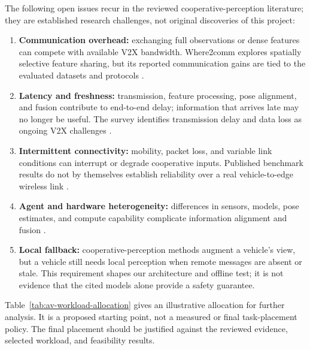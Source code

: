 \documentclass[12pt,a4paper,oneside]{report}
\begin{document}
The following open issues recur in the reviewed cooperative-perception
literature; they are established research challenges, not original
discoveries of this project:
\begin{enumerate}
  \item \textbf{Communication overhead:} exchanging full observations or
  dense features can compete with available V2X bandwidth. Where2comm
  explores spatially selective feature sharing, but its reported
  communication gains are tied to the evaluated datasets and protocols
  \cite{where2comm2022,opv2v2022}.
  \item \textbf{Latency and freshness:} transmission, feature processing,
  pose alignment, and fusion contribute to end-to-end delay; information
  that arrives late may no longer be useful. The survey identifies
  transmission delay and data loss as ongoing V2X challenges
  \cite{v2xsurvey2025}.
  \item \textbf{Intermittent connectivity:} mobility, packet loss, and
  variable link conditions can interrupt or degrade cooperative inputs.
  Published benchmark results do not by themselves establish reliability
  over a real vehicle-to-edge wireless link \cite{v2xsurvey2025,opv2v2022}.
  \item \textbf{Agent and hardware heterogeneity:} differences in sensors,
  models, pose estimates, and compute capability complicate information
  alignment and fusion \cite{v2xvit2022,v2xsurvey2025}.
  \item \textbf{Local fallback:} cooperative-perception methods augment a
  vehicle's view, but a vehicle still needs local perception when remote
  messages are absent or stale. This requirement shapes our architecture
  and offline test; it is not evidence that the cited models alone provide
  a safety guarantee.
\end{enumerate}

Table~\ref{tab:av-workload-allocation} gives an illustrative allocation
for further analysis. It is a proposed starting point, not a measured or
final task-placement policy. The final placement should be justified
against the reviewed evidence, selected workload, and feasibility results.
\end{document}
